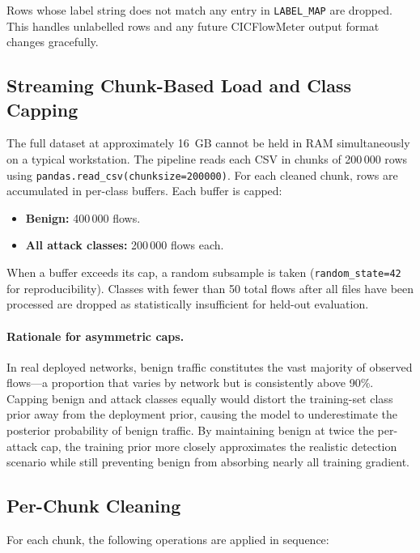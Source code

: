 \documentclass[12pt]{article}
\theoremstyle{plain}
\begin{document}
Rows whose label string does not match any entry in \texttt{LABEL\_MAP} are dropped. This handles unlabelled rows and any future CICFlowMeter output format changes gracefully.

\subsection{Streaming Chunk-Based Load and Class Capping}

The full dataset at approximately 16~GB cannot be held in RAM simultaneously on a typical workstation. The pipeline reads each CSV in chunks of 200\,000 rows using \texttt{pandas.read\_csv(chunksize=200000)}. For each cleaned chunk, rows are accumulated in per-class buffers. Each buffer is capped:

\begin{itemize}
    \item \textbf{Benign:} 400\,000 flows.
    \item \textbf{All attack classes:} 200\,000 flows each.
\end{itemize}

When a buffer exceeds its cap, a random subsample is taken (\texttt{random\_state=42} for reproducibility). Classes with fewer than 50 total flows after all files have been processed are dropped as statistically insufficient for held-out evaluation.

\paragraph{Rationale for asymmetric caps.}
In real deployed networks, benign traffic constitutes the vast majority of observed flows—a proportion that varies by network but is consistently above 90\%. Capping benign and attack classes equally would distort the training-set class prior away from the deployment prior, causing the model to underestimate the posterior probability of benign traffic. By maintaining benign at twice the per-attack cap, the training prior more closely approximates the realistic detection scenario while still preventing benign from absorbing nearly all training gradient.

\subsection{Per-Chunk Cleaning}

For each chunk, the following operations are applied in sequence:
\end{document}
